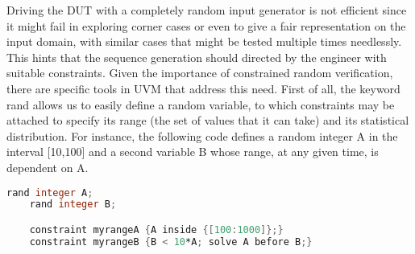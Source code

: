 Driving the DUT with a completely random input generator is not efficient since it might fail in exploring corner cases or even to give a fair representation on the input domain, with similar cases that might be tested multiple times needlessly. This hints that the sequence generation should directed by the engineer with suitable constraints. Given the importance of constrained random verification, there are specific tools in UVM that address this need. First of all, the keyword rand allows us to easily define a random variable, to which constraints may be attached to specify its range (the set of values that it can take) and its statistical distribution. For instance, the following code defines a random integer A in the interval [10,100] and a second variable B whose range, at any given time, is dependent on A.
\begin{lstlisting}[language=verilog, caption= Constrained random sequencer from \textit{packet\_in.sv}]
	rand integer A;
	rand integer B;

	constraint myrangeA {A inside {[100:1000]};}
	constraint myrangeB {B < 10*A; solve A before B;}
\end{lstlisting}
